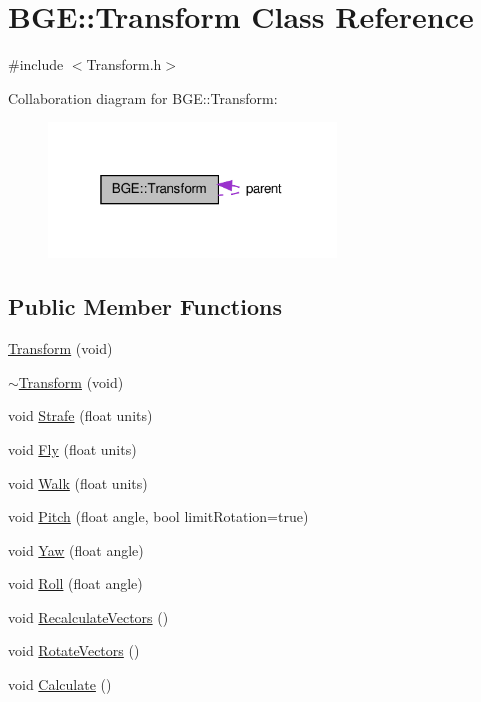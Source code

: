 \hypertarget{class_b_g_e_1_1_transform}{\section{B\-G\-E\-:\-:Transform Class Reference}
\label{class_b_g_e_1_1_transform}
}


{\ttfamily \#include $<$Transform.\-h$>$}



Collaboration diagram for B\-G\-E\-:\-:Transform\-:
\nopagebreak
\begin{figure}[H]
\begin{center}
\leavevmode
\includegraphics[width=217pt]{class_b_g_e_1_1_transform__coll__graph}
\end{center}
\end{figure}
\subsection*{Public Member Functions}
\begin{DoxyCompactItemize}
\item 
\hyperlink{class_b_g_e_1_1_transform_a2bd04f8338d86c793d3e2dea51a097d0}{Transform} (void)
\item 
\hyperlink{class_b_g_e_1_1_transform_a80286cc4143f89cb5f8bc8ec3f1dcb74}{$\sim$\-Transform} (void)
\item 
void \hyperlink{class_b_g_e_1_1_transform_a0f196f5a284360e93d89a6c3682d35c3}{Strafe} (float units)
\item 
void \hyperlink{class_b_g_e_1_1_transform_aaa452fdfbdb3969155b6f1bd47a927ad}{Fly} (float units)
\item 
void \hyperlink{class_b_g_e_1_1_transform_a4896ce57bb9a095e4c0c7d1e516c9794}{Walk} (float units)
\item 
void \hyperlink{class_b_g_e_1_1_transform_af2cd5879cc84f18f569dabb4e5bcda36}{Pitch} (float angle, bool limit\-Rotation=true)
\item 
void \hyperlink{class_b_g_e_1_1_transform_a392eb09dfdeae0f8f0b67a6477ac28f5}{Yaw} (float angle)
\item 
void \hyperlink{class_b_g_e_1_1_transform_a77b194efd21538b95470bf9a84de5834}{Roll} (float angle)
\item 
void \hyperlink{class_b_g_e_1_1_transform_ae0f8cd2f1ddaa196ef67b43d01725086}{Recalculate\-Vectors} ()
\item 
void \hyperlink{class_b_g_e_1_1_transform_a42bc887033106184fcaa282a8a88950c}{Rotate\-Vectors} ()
\item 
void \hyperlink{class_b_g_e_1_1_transform_a8f697d8c4ea4f6c4e24a79354bcc7070}{Calculate} ()
\end{DoxyCompactItemize}
